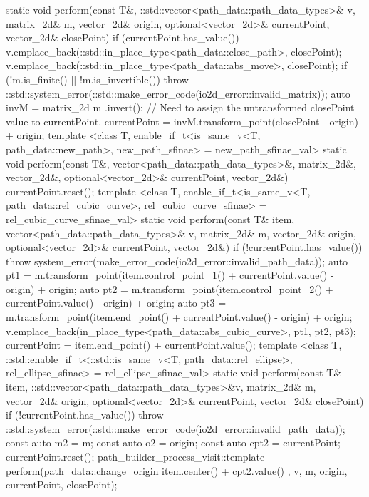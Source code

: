 \begin{codeblock}
{{      static void perform(const T&, ::std::vector<path_data::path_data_types>& v, matrix_2d& m, vector_2d& origin, optional<vector_2d>& currentPoint, vector_2d& closePoint) {
        if (currentPoint.has_value()) {
          v.emplace_back(::std::in_place_type<path_data::close_path>, closePoint);
          v.emplace_back(::std::in_place_type<path_data::abs_move>,
            closePoint);
          if (!m.is_finite() || !m.is_invertible()) {
            throw ::std::system_error(::std::make_error_code(io2d_error::invalid_matrix));
          }
          auto invM = matrix_2d{ m }.invert();
          // Need to assign the untransformed closePoint value to currentPoint.
          currentPoint = invM.transform_point(closePoint - origin) + origin;
        }
      }
      template <class T, enable_if_t<is_same_v<T, path_data::new_path>, new_path_sfinae> = new_path_sfinae_val>
      static void perform(const T&, vector<path_data::path_data_types>&, matrix_2d&, vector_2d&, optional<vector_2d>& currentPoint, vector_2d&) {
        currentPoint.reset();
      }
      template <class T, enable_if_t<is_same_v<T, path_data::rel_cubic_curve>, rel_cubic_curve_sfinae> = rel_cubic_curve_sfinae_val>
      static void perform(const T& item, vector<path_data::path_data_types>& v, matrix_2d& m, vector_2d& origin, optional<vector_2d>& currentPoint, vector_2d&) {
        if (!currentPoint.has_value()) {
          throw system_error(make_error_code(io2d_error::invalid_path_data));
        }
        auto pt1 = m.transform_point(item.control_point_1() + currentPoint.value() -
          origin) + origin;
        auto pt2 = m.transform_point(item.control_point_2() + currentPoint.value() -
          origin) + origin;
        auto pt3 = m.transform_point(item.end_point() + currentPoint.value() - origin) +
          origin;
        v.emplace_back(in_place_type<path_data::abs_cubic_curve>,
          pt1, pt2, pt3);
        currentPoint = item.end_point() + currentPoint.value();
      }
      template <class T, ::std::enable_if_t<::std::is_same_v<T, path_data::rel_ellipse>, rel_ellipse_sfinae> = rel_ellipse_sfinae_val>
      static void perform(const T& item, ::std::vector<path_data::path_data_types>&v, matrix_2d& m, vector_2d& origin, optional<vector_2d>& currentPoint, vector_2d& closePoint) {
        if (!currentPoint.has_value()) {
          throw ::std::system_error(::std::make_error_code(io2d_error::invalid_path_data));
        }
        const auto m2 = m;
        const auto o2 = origin;
        const auto cpt2 = currentPoint;
        currentPoint.reset();
        path_builder_process_visit::template perform(path_data::change_origin{ item.center() + cpt2.value() }, v, m, origin, currentPoint, closePoint);
}}}
\end{codeblock}

